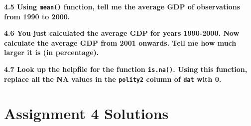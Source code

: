 \documentclass[]{book}
\newenvironment{Shaded}{\begin{snugshade}}{\end{snugshade}}
\newcommand{\CommentTok}[1]{\textcolor[rgb]{0.56,0.35,0.01}{\textit{#1}}}
\newcommand{\DataTypeTok}[1]{\textcolor[rgb]{0.13,0.29,0.53}{#1}}
\newcommand{\DecValTok}[1]{\textcolor[rgb]{0.00,0.00,0.81}{#1}}
\newcommand{\FloatTok}[1]{\textcolor[rgb]{0.00,0.00,0.81}{#1}}
\newcommand{\KeywordTok}[1]{\textcolor[rgb]{0.13,0.29,0.53}{\textbf{#1}}}
\newcommand{\NormalTok}[1]{#1}
\newcommand{\OperatorTok}[1]{\textcolor[rgb]{0.81,0.36,0.00}{\textbf{#1}}}
\newcommand{\StringTok}[1]{\textcolor[rgb]{0.31,0.60,0.02}{#1}}
\begin{document}
\textbf{4.5 Using \texttt{mean()} function, tell me the average GDP of observations from 1990 to 2000.}

\begin{Shaded}
\end{Shaded}

\textbf{4.6 You just calculated the average GDP for years 1990-2000. Now calculate the average GDP from 2001 onwards. Tell me how much larger it is (in percentage).}

\begin{Shaded}
\end{Shaded}

\textbf{4.7 Look up the helpfile for the function \texttt{is.na()}. Using this function, replace all the NA values in the \texttt{polity2} column of \texttt{dat} with 0.}

\begin{Shaded}
\end{Shaded}

\hypertarget{assignment-4-solutions}{%
\section{Assignment 4 Solutions}\label{assignment-4-solutions}}
\end{document}
